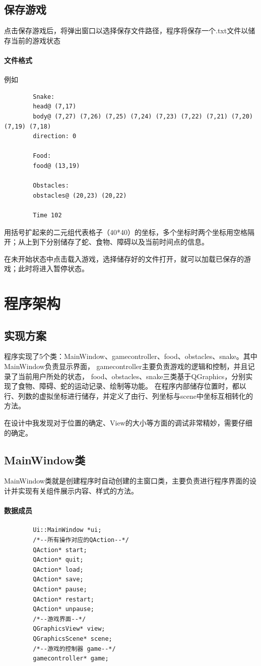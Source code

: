 \documentclass[utf-8]{ctexart}
\begin{document}
    \subsection{保存游戏}
    点击保存游戏后，将弹出窗口以选择保存文件路径，程序将保存一个.txt文件以储存当前的游戏状态
    \paragraph{文件格式}例如
    \begin{lstlisting}
        Snake:
        head@ (7,17)
        body@ (7,27) (7,26) (7,25) (7,24) (7,23) (7,22) (7,21) (7,20) (7,19) (7,18) 
        direction: 0

        Food:
        food@ (13,19)

        Obstacles:
        obstacles@ (20,23) (20,22) 

        Time 102
    \end{lstlisting}
    \par 用括号扩起来的二元组代表格子（40*40）的坐标，多个坐标时两个坐标用空格隔开；从上到下分别储存了蛇、食物、障碍以及当前时间点的信息。
    \par 在未开始状态中点击载入游戏，选择储存好的文件打开，就可以加载已保存的游戏；此时将进入暂停状态。

    \section{程序架构}
    \subsection{实现方案}
    程序实现了5个类：MainWindow、gamecontroller、food、obstacles、snake。其中MainWindow负责显示界面，
    gamecontroller主要负责游戏的逻辑和控制，并且记录了当前用户所处的状态，
    food、obstacles、snake三类基于QGraphics，分别实现了食物、障碍、蛇的运动记录、绘制等功能。
    在程序内部储存位置时，都以行、列数的虚拟坐标进行储存，并定义了由行、列坐标与scene中坐标互相转化的方法。
    \par 在设计中我发现对于位置的确定、View的大小等方面的调试非常精妙，需要仔细的确定。
    \subsection{MainWindow类}
    MainWindow类就是创建程序时自动创建的主窗口类，主要负责进行程序界面的设计并实现有关组件展示内容、样式的方法。
    \paragraph{数据成员}
    \begin{lstlisting}
        Ui::MainWindow *ui;
        /*--所有操作对应的QAction--*/
        QAction* start;
        QAction* quit;
        QAction* load;
        QAction* save;
        QAction* pause;
        QAction* restart;
        QAction* unpause;
        /*--游戏界面--*/
        QGraphicsView* view;
        QGraphicsScene* scene;
        /*--游戏的控制器 game--*/
        gamecontroller* game;
    \end{lstlisting}
\end{document}
